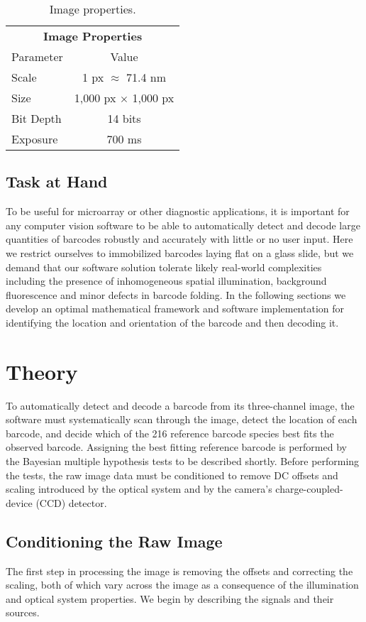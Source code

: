 \begin{table}[htbp] 
\begin{center}
\begin{tabular}{l c}
\multicolumn{2}{c}{\textbf{Image Properties}}\\
Parameter & Value \\
\hline
Scale & 1 px $\approx$ 71.4 nm \\
Size & 1,000 px $\times$ 1,000 px \\
Bit Depth & 14 bits\\
Exposure & 700 ms\\
\hline
\end{tabular}
\end{center}
\caption{Image properties. \label{table:image}	}
\end{table}
 
\subsection{Task at Hand}
To be useful for microarray or other diagnostic applications, it is important for any computer vision software to be able to automatically detect and decode large quantities of barcodes robustly and accurately with little or no user input. 
Here we restrict ourselves to immobilized barcodes laying flat on a glass slide, but we demand that our software solution tolerate likely real-world complexities including the presence of inhomogeneous spatial illumination, background fluorescence and minor defects in barcode folding.  
In the following sections we develop an optimal mathematical framework and software implementation for identifying the location and orientation of the barcode and then decoding it.


\section{Theory}
To automatically detect and decode a barcode from its three-channel image, the software must systematically scan through the image, detect the location of each barcode, and decide which of the 216 reference barcode species best fits the observed barcode. Assigning the best fitting reference barcode is performed by the Bayesian multiple hypothesis tests to be described shortly. Before performing the tests, the raw image data must be conditioned to remove DC offsets and scaling introduced by the optical system and by the camera's charge-coupled-device (CCD) detector.


\subsection{Conditioning the Raw Image}
The first step in processing the image is removing the offsets and correcting the scaling, both of which vary across the image as a consequence of the illumination and optical system properties. We begin by describing the signals and their sources.

